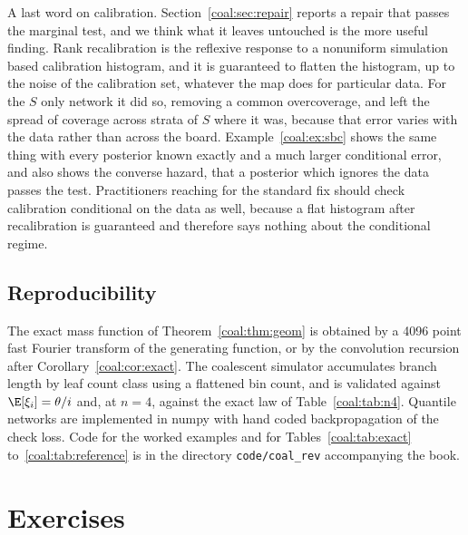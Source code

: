 A last word on calibration. Section~\ref{coal:sec:repair} reports a repair that passes the marginal test, and we think what it leaves untouched is the more useful finding. Rank recalibration is the reflexive response to a nonuniform simulation based calibration histogram, and it is guaranteed to flatten the histogram, up to the noise of the calibration set, whatever the map does for particular data. For the $S$ only network it did so, removing a common overcoverage, and left the spread of coverage across strata of $S$ where it was, because that error varies with the data rather than across the board. Example~\ref{coal:ex:sbc} shows the same thing with every posterior known exactly and a much larger conditional error, and also shows the converse hazard, that a posterior which ignores the data passes the test. Practitioners reaching for the standard fix should check calibration conditional on the data as well, because a flat histogram after recalibration is guaranteed and therefore says nothing about the conditional regime.

\subsection*{Reproducibility}

The exact mass function of Theorem~\ref{coal:thm:geom} is obtained by a 4096 point fast Fourier transform of the generating function, or by the convolution recursion after Corollary~\ref{coal:cor:exact}. The coalescent simulator accumulates branch length by leaf count class using a flattened bin count, and is validated against $\E[\xi_i]=\theta/i$ and, at $n=4$, against the exact law of Table~\ref{coal:tab:n4}. Quantile networks are implemented in numpy with hand coded backpropagation of the check loss. Code for the worked examples and for Tables~\ref{coal:tab:exact} to~\ref{coal:tab:reference} is in the directory \texttt{code/coal\_rev} accompanying the book.

\section{Exercises}\label{coal:sec:exercises}

